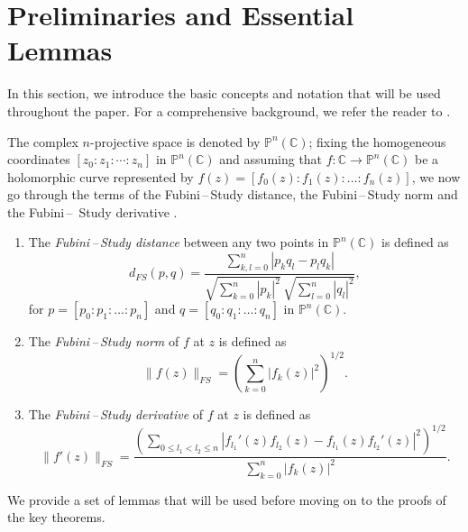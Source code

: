 \documentclass[10pt,a4paper]{amsart}
\numberwithin{equation}{section}
\begin{document}
\section{Preliminaries and Essential Lemmas}
In this section, we introduce the basic concepts and notation that will be used throughout the paper. For 
a comprehensive background, we refer the reader to \cite{chang-csolmalbtc-2026, aljuain-cobtsohm-2019, anderson-obfanf-1974, arbelaez-nhm-2019,aulaskari-avotlptfsnf-2001,bohra-lfptfpnhm-2025,chen-osnf-1996,colonna-banfatr-1989,colonna-tbcobhm-1989,eremenko-nhcfprtps-2007,eremenko-bcoh-2008,jiang-nolm-2020,pang-aeostfnf-2015,quang-wnaqfohc-2018}.\smallskip

The complex $n$-projective space is denoted by  $\mathbb{P}^n(\mathbb{C})$; fixing the homogeneous coordinates
$[z_0:z_1:\cdots:z_n]$ in $\mathbb P^n(\mathbb C)$ and assuming that $f : \mathbb{C} \to \mathbb{P}^n(\mathbb{C})$ be a holomorphic curve represented by 
$f(z) = [f_0(z) : f_1(z) : \dots : f_n(z)]$, we now go through the terms of the Fubini\,–\,Study distance, the Fubini\,–\,Study norm and the Fubini\,–
\,Study derivative \cite{eremenko-nhcfprtps-2007, quang-wnaqfohc-2018}.

\begin{enumerate}
    \item The \emph{Fubini\,--\,Study distance} between any two points in $\mathbb P^n(\mathbb C)$ is defined as
\begin{equation*}
d_{FS}(p,q) = \frac{\sum_{k,l=0}^n |p_k q_l - p_l q_k|}{\sqrt{\sum_{k=0}^n |p_k|^2} \, \sqrt{\sum_{l=0}^n |q_l|^2}},
\end{equation*}
for $p = [p_0 : p_1 : \dots : p_n]$ and $q = [q_0 : q_1 : \dots : q_n]$ in $\mathbb{P}^n(\mathbb{C})$. \smallskip
    \item The \emph{Fubini\,--\,Study norm} of $f$ at $z$ is defined as \begin{equation*}
\|f(z)\|_{FS} = \left( \sum_{k=0}^n |f_k(z)|^2 \right)^{1/2}.
\end{equation*}
    \item The \emph{Fubini\,--\,Study derivative} of $f$ at $z$ is defined as \begin{equation*}
\|f'(z)\|_{FS} = 
\frac{\left( \sum_{0 \le l_1 < l_2 \le n} 
\left| f_{l_1}'(z) f_{l_2}(z) - f_{l_1}(z) f_{l_2}'(z) \right|^2 \right)^{1/2}}
{\sum_{k=0}^n |f_k(z)|^2}.
\end{equation*}
\end{enumerate}

We provide a set of lemmas that will be used before moving on to the proofs of the key theorems. \smallskip
\end{document}
